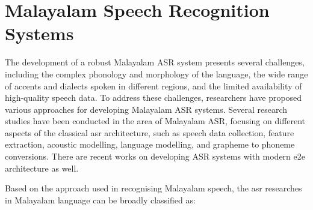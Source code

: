 \section{Malayalam Speech Recognition Systems} \label{sec:Literature-malayalamasr}



The development of a robust Malayalam ASR system presents several challenges, including the complex phonology and morphology of the language, the wide range of accents and dialects spoken in different regions, and the limited availability of high-quality speech data. To address these challenges, researchers have proposed various approaches for developing Malayalam ASR systems. Several research studies have been conducted in the area of Malayalam ASR, focusing on different aspects of the classical \gls{asr} architecture, such as speech data collection, feature extraction, acoustic modelling, language modelling, and grapheme to phoneme conversions. There are recent works on developing ASR systems with modern \gls{e2e} architecture as well.

Based on the approach used in recognising Malayalam speech, the \gls{asr} researches in Malayalam language can be broadly classified as:

